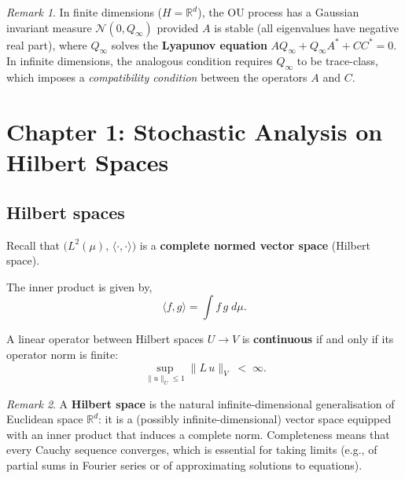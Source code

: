 \documentclass[11pt]{article}
\theoremstyle{definition}
\theoremstyle{remark}
\newtheorem{remark}{Remark}
\begin{document}
\begin{remark}
In finite dimensions ($H = \mathbb{R}^d$), the OU process
has a Gaussian invariant measure $\mathcal{N}(0, Q_\infty)$
provided $A$ is stable (all eigenvalues have negative real part),
where $Q_\infty$ solves the \textbf{Lyapunov equation}
$A Q_\infty + Q_\infty A^* + C C^* = 0$.  In infinite dimensions,
the analogous condition requires $Q_\infty$ to be trace-class,
which imposes a \emph{compatibility condition} between the
operators $A$ and $C$.
\end{remark}

\newpage
\section*{Chapter 1: Stochastic Analysis on Hilbert Spaces}

\subsection*{Hilbert spaces}


Recall that $\bigl(L^2(\mu),\,\langle\cdot,\cdot\rangle\bigr)$ is a
\textbf{complete normed vector space} (Hilbert space).

The inner product is given by,
\[
    \langle f, g \rangle = \int f\,g\;d\mu.
\]


A linear operator between Hilbert spaces $U \to V$ is \textbf{continuous}
if and only if its operator norm is finite:
\[
    \sup_{\|u\|_U \le 1} \|L\,u\|_V \;<\; \infty.
\]

\begin{remark}
A \textbf{Hilbert space} is the natural infinite-dimensional
generalisation of Euclidean space $\mathbb{R}^d$: it is a
(possibly infinite-dimensional) vector space equipped with an
inner product that induces a complete norm.  Completeness means
that every Cauchy sequence converges, which is essential for
taking limits (e.g., of partial sums in Fourier series or of
approximating solutions to equations).
\end{remark}
\end{document}
